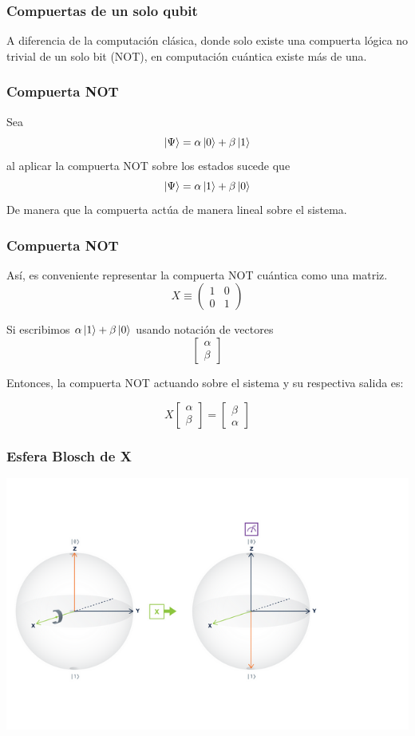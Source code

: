 \documentclass{beamer}
\begin{document}
\begin{frame}
  \frametitle{Compuertas de un solo qubit}
  A diferencia de la computación clásica, donde solo existe una compuerta lógica no trivial de un solo bit (NOT),
  en computación cuántica existe más de una.
\end{frame}

\begin{frame}
  \frametitle{Compuerta NOT}
  Sea 
  $$\ket{\Psi} = \alpha\ket{0} + \beta\ket{1}$$
  al aplicar la compuerta NOT sobre los estados sucede que
  $$\ket{\Psi} = \alpha\ket{1} + \beta\ket{0}$$
  De manera que la compuerta actúa de manera lineal sobre el sistema.
\end{frame}

\begin{frame}
  \frametitle{Compuerta NOT}
  Así, es conveniente representar la compuerta NOT cuántica como una matriz.
  $$X \equiv
  \begin{pmatrix}
    1 & 0 \\
    0 & 1
  \end{pmatrix}$$
  
  
\end{frame}

\begin{frame}
  Si escribimos $\alpha\ket{1} + \beta\ket{0}$ usando notación de vectores
  $$
  \begin{bmatrix}
    \alpha \\
    \beta
  \end{bmatrix}
  $$

  Entonces, la compuerta NOT actuando sobre el sistema y su respectiva salida es:

  $$
  X\begin{bmatrix}
    \alpha \\
    \beta
  \end{bmatrix} =
  \begin{bmatrix}
    \beta \\
    \alpha
  \end{bmatrix}
  $$
\end{frame}

\begin{frame}
  \frametitle{Esfera Blosch de X}
  \includegraphics[scale=.60]{x-blochsphere.png}
\end{frame}
\end{document}
